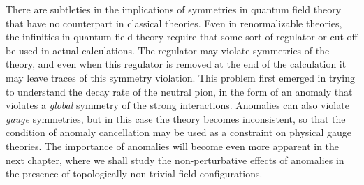 
There are subtleties in the implications of symmetries in quantum field
theory that have no counterpart in classical theories. Even in renormalizable
theories, the infinities in quantum field theory require that some sort of
regulator or cut-off be used in actual calculations. The regulator may
violate symmetries of the theory, and even when this regulator is removed at
the end of the calculation it may leave traces of this symmetry violation.
This problem first emerged in trying to understand the decay rate of the
neutral pion, in the form of an anomaly that violates a \emph{global}
symmetry of the strong interactions. Anomalies can also violate \emph{gauge}
symmetries, but in this case the theory becomes inconsistent, so that the
condition of anomaly cancellation may be used as a constraint on physical
gauge theories. The importance of anomalies will become even more apparent
in the next chapter, where we shall study the non-perturbative effects of
anomalies in the presence of topologically non-trivial field configurations.

